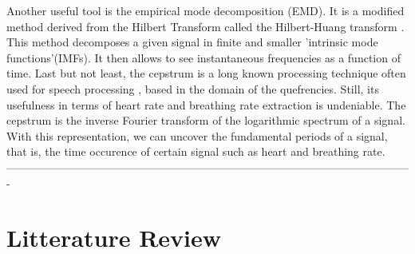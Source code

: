 \documentclass[twoside,onecolumn]{article}
\begin{document}
Another useful tool is the empirical mode decomposition (EMD). It is a modified method derived from the Hilbert Transform called the Hilbert-Huang transform \cite{huang_empirical_1998}. This method decomposes a given signal in finite and smaller 'intrinsic mode functions'(IMFs). It then allows to see instantaneous frequencies as a function of time.
Last but not least, the cepstrum is a long known processing technique often used for speech processing \cite{oppenheim_frequency_2004}, based in the domain of the quefrencies. Still, its usefulness in terms of heart rate and breathing rate extraction is undeniable. The cepstrum is the inverse Fourier transform of the logarithmic spectrum of a signal. With this representation, we can uncover the fundamental periods of a signal, that is, the time occurence of certain signal such as heart and breathing rate.
-------------------------------------------------------------------------------------------------------------
\section{Litterature Review}
\end{document}
